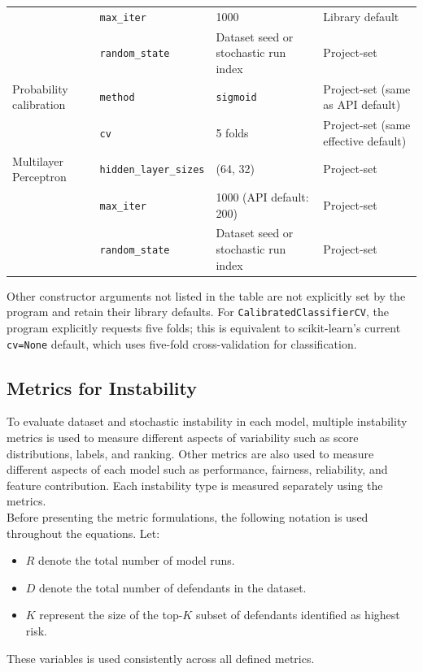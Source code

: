 \documentclass[12pt]{article}
\begin{document}
\begin{longtable}{@{}p{2cm}p{3.75cm}p{5.1cm}p{3.45cm}@{}}
& \texttt{max\_iter} & 1000 & Library default \\
& \texttt{random\_state} & Dataset seed or stochastic run index & Project-set \\
Probability calibration & \texttt{method} & \texttt{sigmoid} & Project-set (same as API default) \\
& \texttt{cv} & 5 folds & Project-set (same effective default) \\
\midrule
Multilayer Perceptron & \texttt{hidden\_layer\_sizes} & (64, 32) & Project-set \\
& \texttt{max\_iter} & 1000 (API default: 200) & Project-set \\
& \texttt{random\_state} & Dataset seed or stochastic run index & Project-set \\
\bottomrule
\end{longtable}

Other constructor arguments not listed in the table are not explicitly set by the program and retain their library defaults. For \texttt{CalibratedClassifierCV}, the program explicitly requests five folds; this is equivalent to scikit-learn's current \texttt{cv=None} default, which uses five-fold cross-validation for classification.

\subsection{Metrics for Instability}
To evaluate dataset and stochastic instability in each model, multiple instability metrics is used to measure different aspects of variability such as score distributions, labels, and ranking. Other metrics are also used to measure different aspects of each model such as performance, fairness, reliability, and feature contribution. Each instability type is measured separately using the metrics.\\

Before presenting the metric formulations, the following notation is used throughout the equations. Let: 
\begin{itemize}
  \item $ R $ denote the total number of model runs.
  \item $ D $ denote the total number of defendants in the dataset.
  \item $ K $ represent the size of the top-$K$ subset of defendants identified as highest risk.
\end{itemize}
\tabto{2em} These variables is used consistently across all defined metrics.
\end{document}
